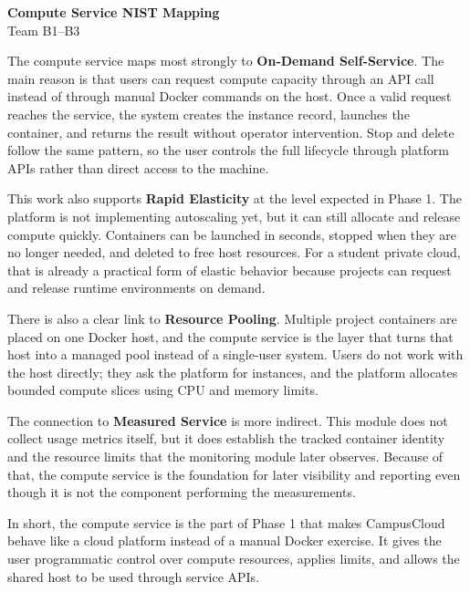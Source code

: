 \documentclass[11pt]{article}
\begin{document}
\begin{center}
    {\Large \textbf{Compute Service NIST Mapping}}\\
    Team B1--B3
\end{center}

The compute service maps most strongly to \textbf{On-Demand Self-Service}. The main reason is that users can request compute capacity through an API call instead of through manual Docker commands on the host. Once a valid request reaches the service, the system creates the instance record, launches the container, and returns the result without operator intervention. Stop and delete follow the same pattern, so the user controls the full lifecycle through platform APIs rather than direct access to the machine.

This work also supports \textbf{Rapid Elasticity} at the level expected in Phase 1. The platform is not implementing autoscaling yet, but it can still allocate and release compute quickly. Containers can be launched in seconds, stopped when they are no longer needed, and deleted to free host resources. For a student private cloud, that is already a practical form of elastic behavior because projects can request and release runtime environments on demand.

There is also a clear link to \textbf{Resource Pooling}. Multiple project containers are placed on one Docker host, and the compute service is the layer that turns that host into a managed pool instead of a single-user system. Users do not work with the host directly; they ask the platform for instances, and the platform allocates bounded compute slices using CPU and memory limits.

The connection to \textbf{Measured Service} is more indirect. This module does not collect usage metrics itself, but it does establish the tracked container identity and the resource limits that the monitoring module later observes. Because of that, the compute service is the foundation for later visibility and reporting even though it is not the component performing the measurements.

In short, the compute service is the part of Phase 1 that makes CampusCloud behave like a cloud platform instead of a manual Docker exercise. It gives the user programmatic control over compute resources, applies limits, and allows the shared host to be used through service APIs.
\end{document}
